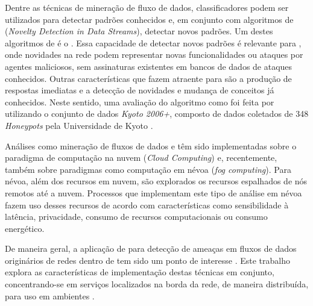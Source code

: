 
Dentre as técnicas de mineração de fluxo de dados, classificadores podem ser
utilizados para detectar padrões conhecidos e, em conjunto com algoritmos de
\nd (\emph{Novelty Detection in Data Streams}), detectar novos padrões.
Um destes algoritmos de \nd é o \minas \cite{Faria2013Minas}.
Essa capacidade de detectar novos padrões é relevante para \nids, onde novidades
na rede podem representar novas funcionalidades ou ataques por agentes
maliciosos, sem assinaturas existentes em bancos de dados de ataques conhecidos.
Outras características que fazem \nd atraente para \nids são a produção de
respostas imediatas e a detecção de novidades e mudança de conceitos já
conhecidos.
Neste sentido, uma avaliação do algoritmo \minas como \nids foi feita por
 utilizando o conjunto de dados \emph{Kyoto 2006+},
composto de dados coletados de 348 \emph{Honeypots} pela Universidade de Kyoto
\cite{KyotoDataset}.

Análises como mineração de fluxos de dados e \nd têm sido implementadas sobre
o paradigma de computação na nuvem (\emph{Cloud Computing}) e, recentemente,
também sobre paradigmas como computação em névoa (\emph{fog computing}).
Para névoa, além dos recursos em nuvem, são explorados os recursos
espalhados de nós remotos até a nuvem.
Processos que implementam este tipo de análise em névoa fazem uso desses
recursos de acordo com características como sensibilidade à latência,
privacidade, consumo de recursos computacionais ou consumo energético.

De maneira geral, a aplicação de \nd para detecção de ameaças em fluxos de dados
originários de redes \iot dentro de \nids tem sido um ponto de interesse
\cite{Viegas2019,AndreoniLopez2019,DaCosta2019a}.
Este trabalho explora as características de implementação destas técnicas
em conjunto, concentrando-se em serviços localizados na borda da rede, de maneira
distribuída, para uso em ambientes \iot.


